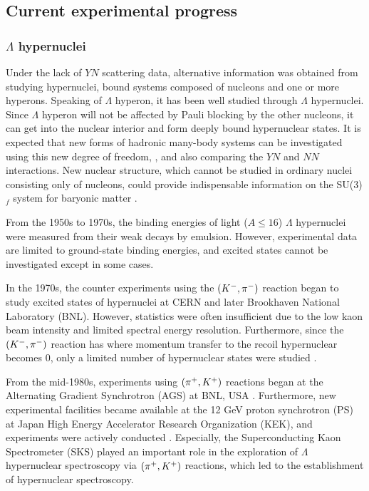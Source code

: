 \clearpage
\subsection{Current experimental progress}
\subsubsection{$\Lambda$ hypernuclei}
Under the lack of $YN$ scattering data, alternative information was obtained from studying hypernuclei, bound systems composed of nucleons and one or more hyperons. Speaking of $\Lambda$ hyperon, it has been well studied through $\Lambda$ hypernuclei. Since $\Lambda$ hyperon will not be affected by Pauli blocking by the other nucleons, it can get into the nuclear interior and form deeply bound hypernuclear states. It is expected that new forms of hadronic many-body systems can be investigated using this new degree of freedom, , and also comparing the $YN$ and $NN$ interactions. New nuclear structure, which cannot be studied in ordinary nuclei consisting only of nucleons, could provide indispensable information on the SU(3)$_f$ system for baryonic matter \cite{Hashi-Tamu}.

From the 1950s to 1970s, the binding energies of light ($A\leq16$) $\Lambda$ hypernuclei were measured from their weak decays by emulsion. However, experimental data are limited to ground-state binding energies, and excited states cannot be investigated except in some cases. 

In the 1970s, the counter experiments using the $(K^-,\pi^-)$ reaction began to study excited states of hypernuclei at CERN and later Brookhaven National Laboratory (BNL). However, statistics were often insufficient due to the low kaon beam intensity and limited spectral energy resolution. Furthermore, since the $(K^-,\pi^-)$ reaction has  where momentum transfer to the recoil hypernuclear becomes 0, only a limited number of hypernuclear states were studied \cite{Kpi-1973, Kpi-1975, Kpi-1976, Kpi-1978, Kpi-1979, Kpi-1981, Kpi-1979-2, Kpi-1981-2, Kpi-1973-2}.

From the mid-1980s, experiments using $(\pi^+,K^+)$ reactions began at the Alternating Gradient Synchrotron (AGS) at BNL, USA \cite{pPK-1985, pPK-1991}. Furthermore, new experimental facilities became available at the 12 GeV proton synchrotron (PS) at Japan High Energy Accelerator Research Organization (KEK), and experiments were actively conducted \cite{PS-1991, PS-1995, PS-1996, PS-1998, PS-2001}. Especially, the Superconducting Kaon Spectrometer (SKS) played an important role in the exploration of $\Lambda$ hypernuclear spectroscopy via $(\pi^+,K^+)$ reactions, which led to the establishment of hypernuclear spectroscopy.

